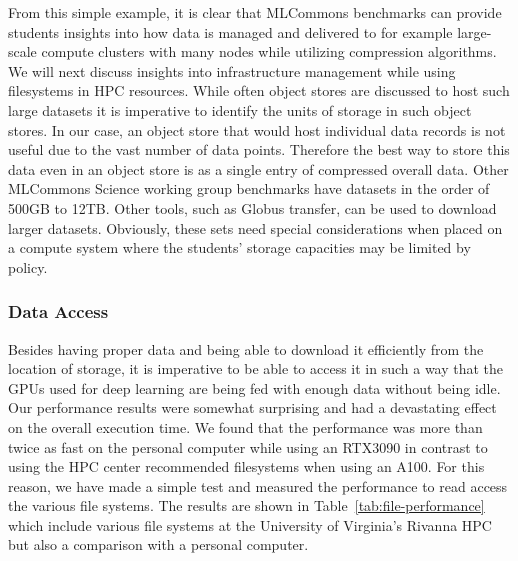 \documentclass[utf8]{FrontiersinVancouver} %
\begin{document}
From this simple example, it is clear that MLCommons benchmarks can
provide students insights into how data is managed and delivered to
for example large-scale compute clusters with many nodes while
utilizing compression algorithms. We will next discuss insights into
infrastructure management while using filesystems in HPC resources.
While often object stores are discussed to host such large datasets it
is imperative to identify the units of storage in such object stores.
In our case, an object store that would host individual data records
is not useful due to the vast number of data points. Therefore the
best way to store this data even in an object store is as a single
entry of compressed overall data.  Other MLCommons Science working
group benchmarks have datasets in the order of 500GB to 12TB. Other
tools, such as Globus transfer, can be used to download larger
datasets.  Obviously, these sets need special considerations when
placed on a compute system where the students' storage capacities may
be limited by policy.


\subsubsection{Data Access}

Besides having proper data and being able to download it efficiently
from the location of storage, it is imperative to be able to access it
in such a way that the GPUs used for deep learning are being fed with
enough data without being idle. Our performance results were somewhat
surprising and had a devastating effect on the overall execution
time. We found that the performance was more than twice as fast on the
personal computer while using an RTX3090 in contrast to using the HPC
center recommended filesystems when using an A100. For this reason, we
have made a simple test and measured the performance to read access
the various file systems. The results are shown in
Table~\ref{tab:file-performance} which include various file systems at
the University of Virginia's Rivanna HPC but also a comparison with a
personal computer.
\end{document}
